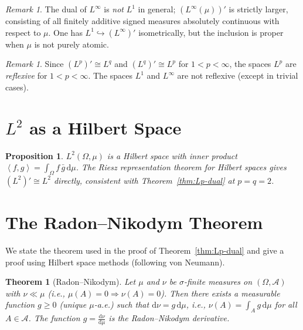 \documentclass[a4paper,12pt]{book}
\newcommand{\dd}{\mathrm{d}}
\newcommand{\inner}[2]{\left\langle #1, #2 \right\rangle}
\theoremstyle{definition}
\theoremstyle{plain}
\newtheorem{theorem}[definition]{Theorem}
\newtheorem{proposition}[definition]{Proposition}
\theoremstyle{remark}
\newtheorem{remark}[definition]{Remark}
\begin{document}
\begin{remark}\label{rem:L-infty-dual}
The dual of $L^\infty$ is \emph{not} $L^1$ in general; $(L^\infty(\mu))'$ is
strictly larger, consisting of all finitely additive signed measures absolutely
continuous with respect to $\mu$. One has $L^1 \hookrightarrow (L^\infty)'$
isometrically, but the inclusion is proper when $\mu$ is not purely atomic.
\end{remark}

\begin{remark}\label{rem:reflexive-Lp}
Since $(L^p)' \cong L^q$ and $(L^q)' \cong L^p$ for $1 < p < \infty$,
the spaces $L^p$ are \emph{reflexive} for $1 < p < \infty$. The spaces
$L^1$ and $L^\infty$ are not reflexive (except in trivial cases).
\end{remark}

\section{$L^2$ as a Hilbert Space}\label{sec:L2-hilbert}


\begin{proposition}\label{prop:L2-hilbert}
$L^2(\Omega, \mu)$ is a Hilbert space with inner product
$\inner{f}{g} = \int_\Omega f\, \bar{g}\, \dd\mu$.
The Riesz representation theorem
for Hilbert spaces gives $(L^2)' \cong L^2$ directly, consistent with
Theorem~\ref{thm:Lp-dual} at $p = q = 2$.
\end{proposition}

\section{The Radon--Nikodym Theorem}\label{sec:radon-nikodym}


We state the theorem used in the proof of Theorem~\ref{thm:Lp-dual} and give a
proof using Hilbert space methods (following von Neumann).

\begin{theorem}[Radon--Nikodym]\label{thm:radon-nikodym}
Let $\mu$ and $\nu$ be $\sigma$-finite measures on $(\Omega, \mathcal{A})$ with
$\nu \ll \mu$ (i.e., $\mu(A) = 0 \Rightarrow \nu(A) = 0$). Then there exists
a measurable function $g \ge 0$ (unique $\mu$-a.e.) such that
$\dd\nu = g\, \dd\mu$, i.e.,
$\nu(A) = \int_A g\, \dd\mu$ for all $A \in \mathcal{A}$.
The function $g = \frac{\dd\nu}{\dd\mu}$ is the \emph{Radon--Nikodym derivative}.
\end{theorem}
\end{document}
